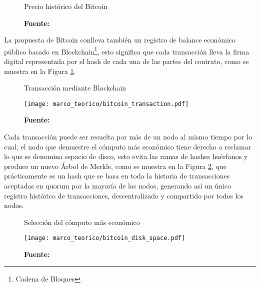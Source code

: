 \documentclass[../main/main.tex]{subfiles}
\begin{document}
  \begin{figure}[H]
    \centering
    \caption{Precio histórico del Bitcoin}
    \newcommand\csvfile{../inc/marco_teorico/bitcoin_price.csv}
    \pgfplotstableread[col sep=comma]{\csvfile}\datatable
    \caption*{\textbf{Fuente:} \cite{web:bitstamp}}
  \end{figure}

  La propuesta de Bitcoin conlleva también un registro de balance económico público basado en Blockchain\footnote{Cadena de Bloques}, esto significa que cada transacción lleva la firma digital representada por el hash de cada una de las partes del contrato, como se muestra en la Figura \ref{fig:bitcoin_transaction}.

  \begin{figure}[ht]
    \centering
    \caption{Transacción mediante Blockchain}
    \texttt{[image: marco\_teorico/bitcoin\_transaction.pdf]}
    \caption*{\textbf{Fuente:} \cite[p.~2]{article:satoshi_bitcoin}}
    \label{fig:bitcoin_transaction}
  \end{figure}

  Cada transacción puede ser resuelta por más de un nodo al mismo tiempo por lo cual, el nodo que demuestre el cómputo más económico tiene derecho a reclamar lo que se denomina espacio de disco, esto evita las ramas de hashes huérfanos y produce un nuevo Árbol de Merkle, como se muestra en la Figura \ref{fig:bitcoin_disk_space}, que prácticamente es un hash que se basa en toda la historia de transacciones aceptadas en quorum por la mayoría de los nodos, generando así un único registro histórico de transacciones, descentralizado y compartido por todos los nodos.

  \begin{figure}[ht]
    \centering
    \caption{Selección del cómputo más económico}
    \texttt{[image: marco\_teorico/bitcoin\_disk\_space.pdf]}
    \caption*{\textbf{Fuente:} \cite[p.~4]{article:satoshi_bitcoin}}
    \label{fig:bitcoin_disk_space}
  \end{figure}
\end{document}
